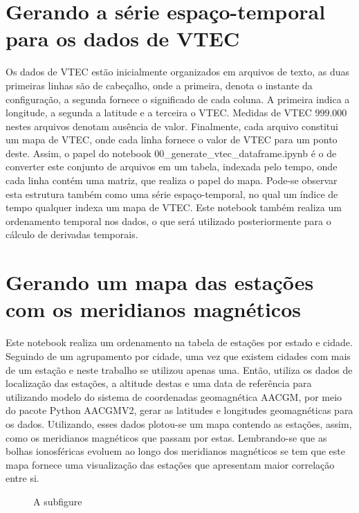 \section{Gerando a série espaço-temporal para os dados de VTEC}

Os dados de VTEC estão inicialmente organizados em arquivos de texto, as duas primeiras linhas são de cabeçalho, onde a primeira, denota o instante da configuração, a segunda fornece o significado de cada coluna. A primeira indica a longitude, a segunda a latitude e a terceira o VTEC. Medidas de VTEC $999.000$ nestes arquivos denotam ausência de valor. Finalmente, cada arquivo constitui um mapa de VTEC, onde cada linha fornece o valor de VTEC para um ponto deste. Assim, o papel do notebook 00\_generate\_vtec\_dataframe.ipynb é o de converter este conjunto de arquivos em um tabela, indexada pelo tempo, onde cada linha contém uma matriz, que realiza o papel do mapa. Pode-se observar esta estrutura também como uma série espaço-temporal, no qual um índice de tempo qualquer indexa um mapa de VTEC. Este notebook também realiza um ordenamento temporal nos dados, o que será utilizado posteriormente para o cálculo de derivadas temporais.

\section{Gerando um mapa das estações com os meridianos magnéticos} 

Este notebook realiza um ordenamento na tabela de estações por estado e cidade. Seguindo de um agrupamento por cidade, uma vez que existem cidades com mais de um estação e neste trabalho se utilizou apenas uma. Então, utiliza os dados de localização das estações, a altitude destas e uma data de referência para utilizando modelo do sistema de coordenadas geomagnética AACGM, por meio do pacote Python AACGMV2, gerar as latitudes e longitudes geomagnéticas para os dados. Utilizando, esses dados plotou-se um mapa contendo as estações, assim, como os meridianos magnéticos que passam por estas. Lembrando-se que as bolhas ionosféricas evoluem ao longo dos meridianos magnéticos se tem que este mapa fornece uma visualização das estações que apresentam maior correlação entre si. 

\begin{figure}[h]
\centering
\makebox[\textwidth][c]{}
\label{fig:mapstations}
\caption{A subfigure}
\end{figure}

